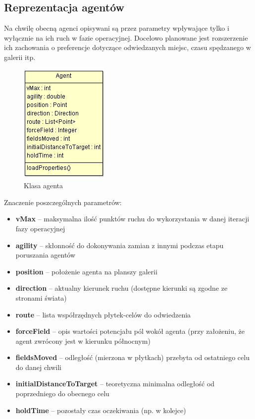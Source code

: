 \documentclass[a4paper, 12pt]{article}
\begin{document}
        \subsection{Reprezentacja agentów}
        \label{sec:actor-impl}

        Na chwilę obecną agenci opisywani są przez parametry wpływające tylko i wyłącznie na ich ruch w fazie operacyjnej. Docelowo planowane jest rozszerzenie ich zachowania o preferencje dotyczące odwiedzanych miejsc, czasu spędzanego w galerii itp.

    \begin{figure}[H]
        \centering
        \includegraphics[scale=0.75]{./img/agent.png}
        \caption{Klasa agenta}
        \label{fig:agent}
    \end{figure}

\noindent
Znaczenie poszczególnych parametrów:
\begin{itemize}
\item \textbf{vMax} – maksymalna ilość punktów ruchu do wykorzystania w danej iteracji fazy operacyjnej
\item \textbf{agility} – skłonność do dokonywania zamian z innymi podczas etapu poruszania agentów
\item \textbf{position} – położenie agenta na planszy galerii
\item \textbf{direction} – aktualny kierunek ruchu (dostępne kierunki są zgodne ze stronami świata)
\item \textbf{route} – lista współrzędnych płytek-celów do odwiedzenia
\item \textbf{forceField} – opis wartości potencjału pól wokół agenta (przy założeniu, że agent zwrócony jest w kierunku północnym)
\item \textbf{fieldsMoved} – odległość (mierzona w płytkach) przebyta od ostatniego celu do danej chwili
\item \textbf{initialDistanceToTarget} – teoretyczna minimalna odległość od poprzedniego do obecnego celu
\item \textbf{holdTime} – pozostały czas oczekiwania (np. w kolejce)
\end{itemize}
\end{document}
